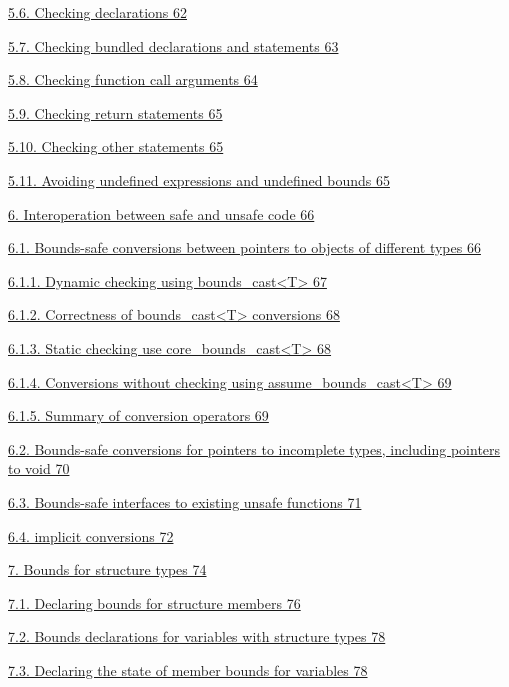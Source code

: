 \documentclass[]{article}
\begin{document}
\protect\hyperlink{ux5fToc440551902}{5.6. Checking declarations 62}

\protect\hyperlink{ux5fToc440551903}{5.7. Checking bundled declarations
and statements 63}

\protect\hyperlink{ux5fToc440551904}{5.8. Checking function call
arguments 64}

\protect\hyperlink{ux5fToc440551905}{5.9. Checking return statements 65}

\protect\hyperlink{ux5fToc440551906}{5.10. Checking other statements 65}

\protect\hyperlink{ux5fToc440551907}{5.11. Avoiding undefined
expressions and undefined bounds 65}

\protect\hyperlink{ux5fToc440551908}{6. Interoperation between safe and
unsafe code 66}

\protect\hyperlink{ux5fToc440551909}{6.1. Bounds-safe conversions
between pointers to objects of different types 66}

\protect\hyperlink{ux5fToc440551910}{6.1.1. Dynamic checking using
bounds\_cast\textless{}T\textgreater{} 67}

\protect\hyperlink{ux5fToc440551911}{6.1.2. Correctness of
bounds\_cast\textless{}T\textgreater{} conversions 68}

\protect\hyperlink{ux5fToc440551912}{6.1.3. Static checking use
core\_bounds\_cast\textless{}T\textgreater{} 68}

\protect\hyperlink{ux5fToc440551913}{6.1.4. Conversions without checking
using assume\_bounds\_cast\textless{}T\textgreater{} 69}

\protect\hyperlink{ux5fToc440551914}{6.1.5. Summary of conversion
operators 69}

\protect\hyperlink{ux5fToc440551915}{6.2. Bounds-safe conversions for
pointers to incomplete types, including pointers to void 70}

\protect\hyperlink{ux5fToc440551916}{6.3. Bounds-safe interfaces to
existing unsafe functions 71}

\protect\hyperlink{ux5fToc440551917}{6.4. implicit conversions 72}

\protect\hyperlink{ux5fToc440551918}{7. Bounds for structure types 74}

\protect\hyperlink{ux5fToc440551919}{7.1. Declaring bounds for structure
members 76}

\protect\hyperlink{ux5fToc440551920}{7.2. Bounds declarations for
variables with structure types 78}

\protect\hyperlink{ux5fToc440551921}{7.3. Declaring the state of member
bounds for variables 78}
\end{document}
